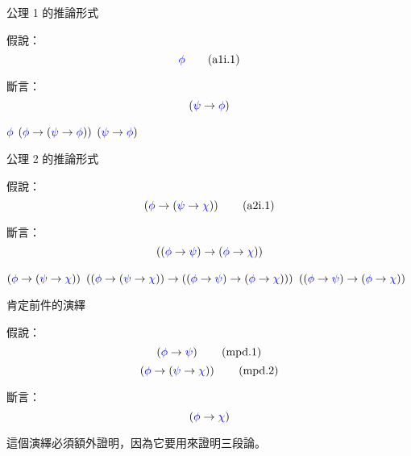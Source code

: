 \documentclass{Slideshow}
\begin{document}
\begin{frame}{公理 1 的推論形式}
    \begin{theorem}[\mmtarget{a1i}]
        假說：
        \[ \wph \tag{a1i.1} \]

        斷言：
        \[ \wi\wps\wph \]

        \begin{mmproof}
            \begin{mmtable}{2em}{3em}
                    $\wph$
                    \label{a1i:1}
                    $\axI\wph\wps$
                    \label{a1i:ax-1}
                    $\wi\wps\wph$
            \end{mmtable}
        \end{mmproof}
    \end{theorem}
\end{frame}

\begin{frame}{公理 2 的推論形式}
    \begin{theorem}[\mmtarget{a2i}]
        \newcommand{\hyp}{\wi\wph{\wi\wps\wch}}

        假說：
        \[ \hyp \tag{a2i.1} \]

        斷言：
        \[ \aIIi\wph\wps\wch \]

        \begin{mmproof}
            \begin{mmtable}{2em}{3em}
                    $\hyp$
                    \label{a2i:1}
                    $\axII\wph\wps\wch$
                    \label{a2i:ax-2}
                    $\aIIi\wph\wps\wch$
            \end{mmtable}
        \end{mmproof}
    \end{theorem}
\end{frame}

\begin{frame}{肯定前件的演繹}
    \begin{theorem}
        假說：
        \[ \wi\wph\wps          \tag{mpd.1} \]
        \[ \wi\wph{\wi\wps\wch} \tag{mpd.2} \]

        斷言：
        \[ \wi\wph\wch \]
    \end{theorem}

    這個演繹必須額外證明，因為它要用來證明三段論。
\end{frame}
\end{document}
